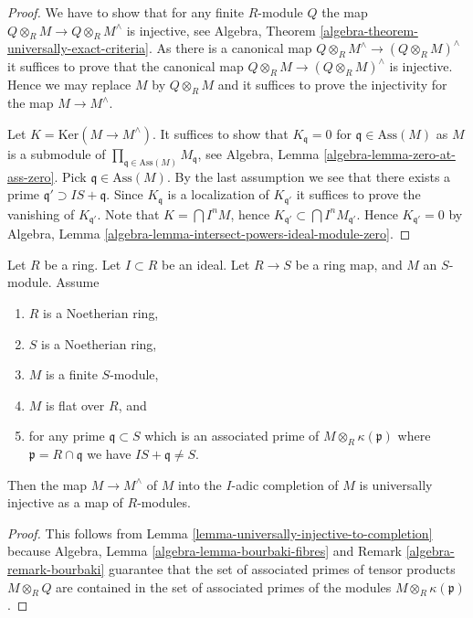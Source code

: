 \begin{proof}
We have to show that for any finite $R$-module $Q$ the map
$Q \otimes_R M \to Q \otimes_R M^\wedge$ is injective, see
Algebra, Theorem \ref{algebra-theorem-universally-exact-criteria}.
As there is a canonical map $Q \otimes_R M^\wedge \to (Q \otimes_R M)^\wedge$
it suffices to prove that the canonical map
$Q \otimes_R M \to (Q \otimes_R M)^\wedge$ is injective.
Hence we may replace $M$ by $Q \otimes_R M$ and it suffices to prove the
injectivity for the map $M \to M^\wedge$.

\medskip\noindent
Let $K = \text{Ker}(M \to M^\wedge)$. It suffices to show that
$K_{\mathfrak q} = 0$ for $\mathfrak q \in \text{Ass}(M)$ as $M$ is a
submodule of $\prod_{\mathfrak q \in \text{Ass}(M)} M_{\mathfrak q}$, see
Algebra, Lemma \ref{algebra-lemma-zero-at-ass-zero}.
Pick $\mathfrak q \in \text{Ass}(M)$. By the last assumption we see that
there exists a prime $\mathfrak q' \supset IS + \mathfrak q$.
Since $K_{\mathfrak q}$ is a localization of $K_{\mathfrak q'}$
it suffices to prove the vanishing of $K_{\mathfrak q'}$.
Note that $K = \bigcap I^nM$, hence
$K_{\mathfrak q'} \subset \bigcap I^nM_{\mathfrak q'}$.
Hence $K_{\mathfrak q'} = 0$ by
Algebra, Lemma \ref{algebra-lemma-intersect-powers-ideal-module-zero}.
\end{proof}

\begin{lemma}
\label{lemma-universally-injective-to-completion-flat}
Let $R$ be a ring.
Let $I \subset R$ be an ideal.
Let $R \to S$ be a ring map, and $M$ an $S$-module.
Assume
\begin{enumerate}
\item $R$ is a Noetherian ring,
\item $S$ is a Noetherian ring,
\item $M$ is a finite $S$-module,
\item $M$ is flat over $R$, and
\item for any prime $\mathfrak q \subset S$ which is an associated prime of
$M \otimes_R \kappa(\mathfrak p)$ where $\mathfrak p = R \cap \mathfrak q$
we have $IS + \mathfrak q \not = S$.
\end{enumerate}
Then the map $M \to M^\wedge$ of $M$ into the $I$-adic completion of $M$
is universally injective as a map of $R$-modules.
\end{lemma}

\begin{proof}
This follows from
Lemma \ref{lemma-universally-injective-to-completion}
because
Algebra, Lemma \ref{algebra-lemma-bourbaki-fibres}
and
Remark \ref{algebra-remark-bourbaki}
guarantee that the set of associated primes of tensor products
$M \otimes_R Q$ are contained in the set of associated primes of
the modules $M \otimes_R \kappa(\mathfrak p)$.
\end{proof}




